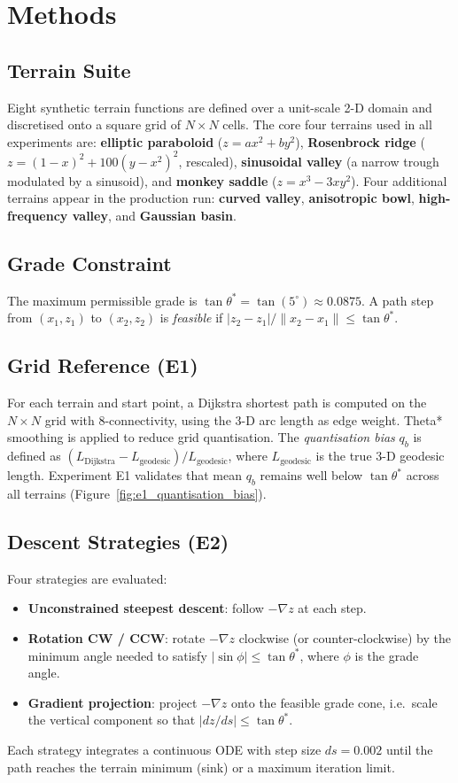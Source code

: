 \documentclass[11pt,a4paper]{article}
\begin{document}
\section{Methods}
\label{sec:methods}

\subsection{Terrain Suite}
Eight synthetic terrain functions are defined over a unit-scale 2-D domain
and discretised onto a square grid of $N\times N$ cells.
The core four terrains used in all experiments are:
\textbf{elliptic paraboloid} ($z = ax^2 + by^2$),
\textbf{Rosenbrock ridge} ($z = (1-x)^2 + 100(y-x^2)^2$, rescaled),
\textbf{sinusoidal valley} (a narrow trough modulated by a sinusoid), and
\textbf{monkey saddle} ($z = x^3 - 3xy^2$).
Four additional terrains appear in the production run:
\textbf{curved valley}, \textbf{anisotropic bowl}, \textbf{high-frequency valley},
and \textbf{Gaussian basin}.

\subsection{Grade Constraint}
The maximum permissible grade is $\tan\theta^* = \tan(5^\circ) \approx 0.0875$.
A path step from $(x_1,z_1)$ to $(x_2,z_2)$ is \emph{feasible} if
$|z_2-z_1|/\|x_2-x_1\| \leq \tan\theta^*$.

\subsection{Grid Reference (E1)}
For each terrain and start point, a Dijkstra shortest path is computed on the
$N\times N$ grid with 8-connectivity, using the 3-D arc length as edge weight.
Theta* smoothing \citep{Daniel2014} is applied to reduce grid quantisation.
The \emph{quantisation bias} $q_b$ is defined as
$(L_{\text{Dijkstra}} - L_{\text{geodesic}}) / L_{\text{geodesic}}$,
where $L_{\text{geodesic}}$ is the true 3-D geodesic length.
Experiment E1 validates that mean $q_b$ remains well below $\tan\theta^*$ across
all terrains (Figure~\ref{fig:e1_quantisation_bias}).

\subsection{Descent Strategies (E2)}
Four strategies are evaluated:
\begin{itemize}
  \item \textbf{Unconstrained steepest descent}: follow $-\nabla z$ at each step.
  \item \textbf{Rotation CW / CCW}: rotate $-\nabla z$ clockwise (or
        counter-clockwise) by the minimum angle needed to satisfy
        $|\sin\phi| \leq \tan\theta^*$, where $\phi$ is the grade angle.
  \item \textbf{Gradient projection}: project $-\nabla z$ onto the feasible
        grade cone, i.e.\ scale the vertical component so that
        $|dz/ds| \leq \tan\theta^*$.
\end{itemize}
Each strategy integrates a continuous ODE with step size $ds=0.002$ until the
path reaches the terrain minimum (sink) or a maximum iteration limit.
\end{document}
